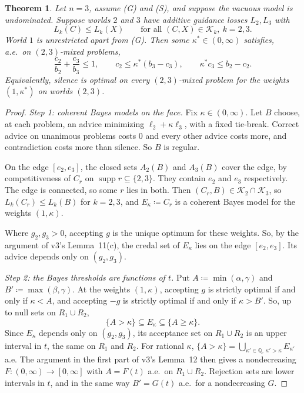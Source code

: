 \documentclass[11pt]{article}
\newtheorem{theorem}{Theorem}
\theoremstyle{remark}\newtheorem{remark}[theorem]{Remark}
\newcommand{\Kscr}{\mathcal K}
\newcommand{\supp}{\operatorname{supp}}
\begin{document}
\begin{theorem}\label{thm:one-world}
Let $n=3$, assume (G) and (S), and suppose the vacuous model is undominated.
Suppose worlds $2$ and $3$ have additive guidance losses $L_2,L_3$ with
\[
 L_k(C)\le L_k(X)\qquad\text{for all }(C,X)\in\Kscr_k,\ k=2,3.
\]
World $1$ is unrestricted apart from (G). Then some $\kappa^*\in(0,\infty)$
satisfies, a.e.\ on $(2,3)$-mixed problems,
\begin{equation}
 \frac{c_2}{b_2}+\frac{c_3}{b_3}\le1,\qquad
 c_2\le\kappa^*(b_3-c_3),\qquad
 \kappa^*c_3\le b_2-c_2.
 \label{eq:forced-23}
\end{equation}
Equivalently, silence is optimal on every $(2,3)$-mixed problem for the
weights $(1,\kappa^*)$ on worlds $(2,3)$.
\end{theorem}
\begin{proof}
\emph{Step 1: coherent Bayes models on the face.} Fix $\kappa\in(0,\infty)$.
Let $B$ choose, at each problem, an advice minimizing $\ell_2+\kappa\ell_3$,
with a fixed tie-break. Correct advice on unanimous problems costs $0$ and
every other advice costs more, and contradiction costs more than silence. So
$B$ is regular.

On the edge $[e_2,e_3]$, the closed sets $A_2(B)$ and $A_3(B)$ cover the
edge, by competitiveness of $C_r$ on $\supp r\subseteq\{2,3\}$. They contain
$e_2$ and $e_3$ respectively. The edge is connected, so some $r$ lies in both.
Then $(C_r,B)\in\Kscr_2\cap\Kscr_3$, so $L_k(C_r)\le L_k(B)$ for $k=2,3$, and
$E_\kappa\coloneqq C_r$ is a coherent Bayes model for the weights
$(1,\kappa)$.

Where $g_2,g_3>0$, accepting $g$ is the unique optimum for these weights. So,
by the argument of v3's Lemma~11(c), the credal set of $E_\kappa$ lies on the
edge $[e_2,e_3]$. Its advice depends only on $(g_2,g_3)$.

\emph{Step 2: the Bayes thresholds are functions of $t$.} Put
$A\coloneqq\min(\alpha,\gamma)$ and $B'\coloneqq\max(\beta,\gamma)$. At the
weights $(1,\kappa)$, accepting $g$ is strictly optimal if and only if
$\kappa<A$, and accepting $-g$ is strictly optimal if and only if
$\kappa>B'$. So, up to null sets on $R_1\cup R_2$,
\[
 \{A>\kappa\}\subseteq E_\kappa\subseteq\{A\ge\kappa\}.
\]
Since $E_\kappa$ depends only on $(g_2,g_3)$, its acceptance set on
$R_1\cup R_2$ is an upper interval in $t$, the same on $R_1$ and $R_2$. For
rational $\kappa$,
$\{A>\kappa\}=\bigcup_{\kappa'\in\mathbb Q,\,\kappa'>\kappa}E_{\kappa'}$ a.e.
The argument in the first part of v3's Lemma~12 then gives a nondecreasing
$F:(0,\infty)\to[0,\infty]$ with $A=F(t)$ a.e.\ on $R_1\cup R_2$. Rejection sets
are lower intervals in $t$, and in the same way $B'=G(t)$ a.e.\ for a
nondecreasing $G$.


\end{proof}
\end{document}
